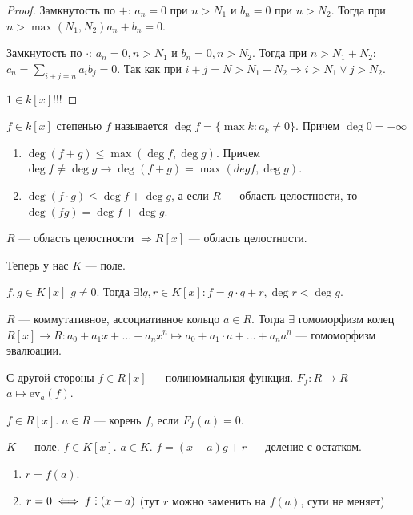 \begin{proof}
    Замкнутость по $+$:  $a_n = 0$ при  $n > N_1$ и  $b_n = 0$ при $n > N_2$. Тогда при $n > \max(N_1, N_2) a_n+b_n = 0$.

    Замкнутость по $\cdot$:  $a_n = 0, n > N_1$ и $b_n = 0, n > N_2$. Тогда при  $n > N_1+N_2:$ $c_n = \sum_{i+j=n} a_ib_j = 0$. Так как при  $i + j = N > N_1+N_2 \Rightarrow i > N_1 \lor j > N_2$.

    $1 \in k[x]$!!!
\end{proof}
\begin{definition}
    $f \in k[x]$ степенью  $f$ называется  $\deg f = \{\max k: a_k \neq 0\}$. Причем $\deg 0 = -\infty$
\end{definition}
\begin{properties}
    \slashn
    \begin{enumerate}
        \item $\deg (f+g) \le \max(\deg f, \deg g)$. Причем $\deg f \neq \deg g \to \deg(f+g) = \max(deg f, \deg g)$. 
        \item $\deg(f\cdot g) \le \deg f + \deg g$, а если $R$ --- область целостности, то  $\deg (fg) = \deg f + \deg g$.
    \end{enumerate}
\end{properties}
\begin{consequence}
    $R$ --- область целостности  $\Rightarrow R[x]$ --- область целостности.
\end{consequence}
\slashn
Теперь у нас $K$ --- поле.
\begin{theorem}
    $f, g \in K[x]$ $g \neq 0$. Тогда  $\exists! q, r \in K[x]: f = g\cdot q + r, \deg r < \deg g$.
\end{theorem}
\begin{consequence}
    $R$ --- коммутативное, ассоциативное кольцо  $a \in R$. Тогда $\exists$ гомоморфизм колец  $R[x] \to R: a_0 + a_1 x + \ldots + a_n x^n \mapsto a_0 + a_1 \cdot a + \ldots + a_n a^n$ --- гомоморфизм эвалюации. 

    С другой стороны $f \in R[x]$ --- полиномиальная функция.  $F_f: R \to R$  $a \mapsto \text{ev}_a(f)$.
\end{consequence}
\begin{definition}
    $f \in R[x]$.  $a\in R$ --- корень  $f$, если  $F_f(a) = 0$.
\end{definition}
\begin{theorem}[Безу]
    $K$ --- поле.  $f \in K[x]$. $a \in K$. $f = (x-a)g + r$ --- деление с остатком.
    \begin{enumerate}
        \item $r = f(a)$.
	\item  $r = 0 \iff f \divby (x-a)$ (тут $r$ можно заменить на $f(a)$, сути не меняет)
    \end{enumerate}
\end{theorem}
